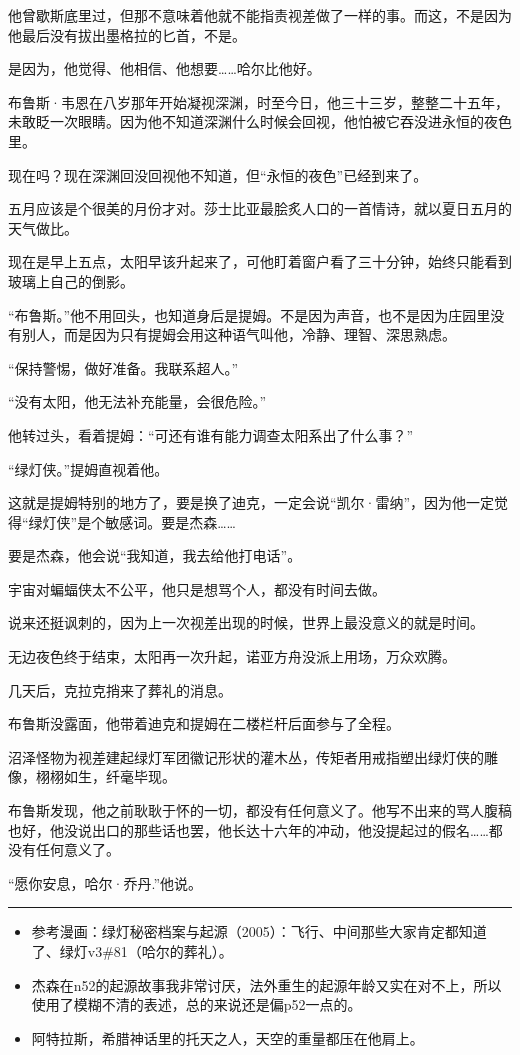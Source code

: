\documentclass[../main]{subfiles}
\begin{document}
他曾歇斯底里过，但那不意味着他就不能指责视差做了一样的事。而这，不是因为他最后没有拔出墨格拉的匕首，不是。

是因为，他觉得、他相信、他想要……哈尔比他好。

布鲁斯·韦恩在八岁那年开始凝视深渊，时至今日，他三十三岁，整整二十五年，未敢眨一次眼睛。因为他不知道深渊什么时候会回视，他怕被它吞没进永恒的夜色里。

现在吗？现在深渊回没回视他不知道，但“永恒的夜色”已经到来了。

五月应该是个很美的月份才对。莎士比亚最脍炙人口的一首情诗，就以夏日五月的天气做比。

现在是早上五点，太阳早该升起来了，可他盯着窗户看了三十分钟，始终只能看到玻璃上自己的倒影。

“布鲁斯。”他不用回头，也知道身后是提姆。不是因为声音，也不是因为庄园里没有别人，而是因为只有提姆会用这种语气叫他，冷静、理智、深思熟虑。

“保持警惕，做好准备。我联系超人。”

“没有太阳，他无法补充能量，会很危险。”

他转过头，看着提姆：“可还有谁有能力调查太阳系出了什么事？”

“绿灯侠。”提姆直视着他。

这就是提姆特别的地方了，要是换了迪克，一定会说“凯尔·雷纳”，因为他一定觉得“绿灯侠”是个敏感词。要是杰森……

要是杰森，他会说“我知道，我去给他打电话”。

宇宙对蝙蝠侠太不公平，他只是想骂个人，都没有时间去做。

说来还挺讽刺的，因为上一次视差出现的时候，世界上最没意义的就是时间。

无边夜色终于结束，太阳再一次升起，诺亚方舟没派上用场，万众欢腾。

几天后，克拉克捎来了葬礼的消息。

布鲁斯没露面，他带着迪克和提姆在二楼栏杆后面参与了全程。

沼泽怪物为视差建起绿灯军团徽记形状的灌木丛，传矩者用戒指塑出绿灯侠的雕像，栩栩如生，纤毫毕现。

布鲁斯发现，他之前耿耿于怀的一切，都没有任何意义了。他写不出来的骂人腹稿也好，他没说出口的那些话也罢，他长达十六年的冲动，他没提起过的假名……都没有任何意义了。

“愿你安息，哈尔·乔丹.”他说。

\begin{center}\rule{0.5\linewidth}{0.5pt}\end{center}

\begin{itemize}
    \item
          参考漫画：绿灯秘密档案与起源（2005）：飞行、中间那些大家肯定都知道了、绿灯v3\#81（哈尔的葬礼）。
    \item
          杰森在n52的起源故事我非常讨厌，法外重生的起源年龄又实在对不上，所以使用了模糊不清的表述，总的来说还是偏p52一点的。
    \item
          阿特拉斯，希腊神话里的托天之人，天空的重量都压在他肩上。
\end{itemize}
\end{document}

